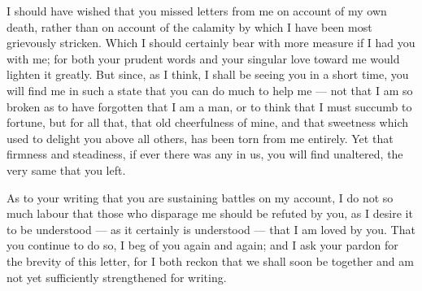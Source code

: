 

 I should have wished that you missed letters from me on account of my own death, rather than on account of the calamity by which I have been most grievously stricken. Which I should certainly bear with more measure if I had you with me; for both your prudent words and your singular love toward me would lighten it greatly. But since, as I think, I shall be seeing you in a short time, you will find me in such a state that you can do much to help me --- not that I am so broken as to have forgotten that I am a man, or to think that I must succumb to fortune, but for all that, that old cheerfulness of mine, and that sweetness which used to delight you above all others, has been torn from me entirely. Yet that firmness and steadiness, if ever there was any in us, you will find unaltered, the very same that you left.

 As to your writing that you are sustaining battles on my account, I do not so much labour that those who disparage me should be refuted by you, as I desire it to be understood --- as it certainly is understood --- that I am loved by you. That you continue to do so, I beg of you again and again; and I ask your pardon for the brevity of this letter, for I both reckon that we shall soon be together and am not yet sufficiently strengthened for writing.
